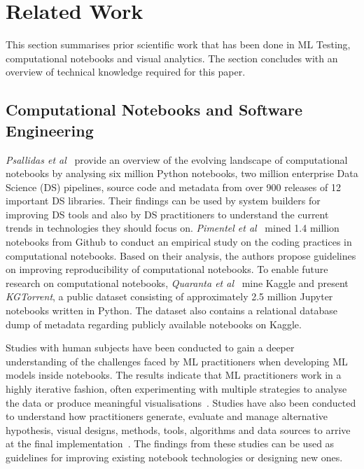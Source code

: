 \section{Related Work}\label{sec:related}

This section summarises prior scientific work that has been done in ML
Testing, computational notebooks and visual analytics. The section
concludes with an overview of technical knowledge required for this
paper.

\subsection{Computational Notebooks and Software Engineering}\label{sec:notebooks}

\emph{Psallidas et al}~\cite{psallidas2019data} provide an overview of the evolving landscape of computational notebooks by analysing six million Python notebooks, two million enterprise Data Science (DS) pipelines, source code and metadata from over 900 releases of 12 important DS libraries. Their findings can be used by system builders for improving DS tools and also by DS practitioners to understand the current trends in technologies they should focus on. \emph{Pimentel et al}~\cite{pimentel2019large-scale} mined 1.4 million notebooks from Github to conduct an empirical study on the coding practices in computational notebooks. Based on their analysis, the authors propose guidelines on improving reproducibility of computational notebooks. To enable future research on computational notebooks, \emph{Quaranta et al}~\cite{quaranta2021kgtorrent} mine Kaggle and present \textit{KGTorrent}, a public dataset consisting of approximately 2.5 million Jupyter notebooks written in Python. The dataset also contains a relational database dump of metadata regarding publicly available notebooks on Kaggle.

Studies with human subjects have been conducted to gain a deeper understanding of the challenges faced by ML practitioners when developing ML models inside notebooks. The results indicate that ML practitioners work in a highly iterative fashion, often experimenting with multiple strategies to analyse the data or produce meaningful visualisations~\cite{kandel2012enterprise, kery2018story, liu2019understanding, chattopadhyay2020whats}. Studies have also been conducted to understand how practitioners generate, evaluate and manage alternative hypothesis, visual designs, methods, tools, algorithms and data sources to arrive at the final implementation~\cite{liu2019understanding,kandel2012enterprise}. The findings from these studies can be used as guidelines for improving existing notebook technologies or designing new ones.

